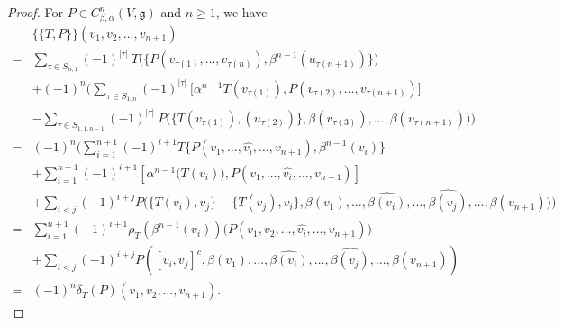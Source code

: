 \documentclass[a4paper,11pt]{amsart}
\theoremstyle{plain}
\theoremstyle{definition}
\theoremstyle{remark}
\numberwithin{equation}{section}
\begin{document}
\begin{proof} For $P \in C^n_{\beta,\alpha}(V,\mathfrak{g})$ and $n\geq 1$, we have
\begin{align*}
&\{\!\!\{T,P \}\!\!\}(v_1,v_2,\ldots,v_{n+1})\\
=&\sum_{\tau\in S_{n,1}}(-1)^{|\tau|}~ T\Big(\{P(v_{\tau(1)},\ldots,v_{\tau(n)}),\beta^{n-1}(u_{\tau(n+1)})\}\Big)\\
&+(-1)^{n}\Bigg(\sum_{\tau\in S_{1,n}}(-1)^{|\tau|}~\big[\alpha^{n-1}T(v_{\tau(1)}),P(v_{\tau(2)},\ldots,v_{\tau(n+1)})\big]\\
& -\sum_{\tau\in S_{1,1,n-1}}(-1)^{|\tau|}~ P\Big(\{T(v_{\tau(1)}),(u_{\tau(2)})\},\beta(v_{\tau(3)}),\ldots,\beta(v_{\tau(n+1)})\Big)\Bigg)\\
=&(-1)^n\bigg(\sum_{i=1}^{n+1}(-1)^{i+1}T\{P(v_1,\ldots,\hat{v_i},\ldots,v_{n+1}),\beta^{n-1}(v_i)\}\\
&+\sum_{i=1}^{n+1}(-1)^{i+1}[\alpha^{n-1}\big(T(v_i)\big), P(v_1,\ldots,\hat{v_i},\ldots,v_{n+1})]\\\nonumber
&+\sum_{ i<j }(-1)^{i+j}P\big(\{T(v_i),v_j\}-\{T(v_j),v_i\},\beta(v_1),\ldots,\hat{\beta(v_i)},\ldots,\hat{\beta(v_j)},\ldots,\beta(v_{n+1})\big)\bigg)\\
= &\sum_{i=1}^{n+1}(-1)^{i+1}\rho_T(\beta^{n-1}(v_i))\big( P(v_1,v_2,\ldots,\hat{v_i},\ldots,v_{n+1})\big)\\
&+\sum_{ i<j }(-1)^{i+j}P([v_i,v_j]^c,\beta(v_1),\ldots,\hat{\beta(v_i)},\ldots,\hat{\beta(v_j)},\ldots,\beta(v_{n+1}))\\
=&(-1)^n\delta_T(P)(v_1,v_2,\ldots,v_{n+1}).
\end{align*}

\end{proof}


\end{document}
